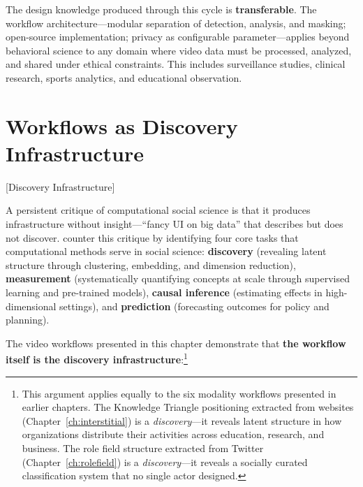 \documentclass[../main.tex]{subfiles}
\begin{document}
The design knowledge produced through this cycle is \textbf{transferable}. The workflow architecture---modular separation of detection, analysis, and masking; open-source implementation; privacy as configurable parameter---applies beyond behavioral science to any domain where video data must be processed, analyzed, and shared under ethical constraints. This includes surveillance studies, clinical research, sports analytics, and educational observation.


\section{Workflows as Discovery Infrastructure}[Discovery Infrastructure]

A persistent critique of computational social science is that it produces infrastructure without insight---``fancy UI on big data'' that describes but does not discover. \textcite{grimmer2021machine} counter this critique by identifying four core tasks that computational methods serve in social science: \textbf{discovery} (revealing latent structure through clustering, embedding, and dimension reduction), \textbf{measurement} (systematically quantifying concepts at scale through supervised learning and pre-trained models), \textbf{causal inference} (estimating effects in high-dimensional settings), and \textbf{prediction} (forecasting outcomes for policy and planning).

The video workflows presented in this chapter demonstrate that \textbf{the workflow itself is the discovery infrastructure}:\footnote{This argument applies equally to the six modality workflows presented in earlier chapters. The Knowledge Triangle positioning extracted from websites (Chapter~\ref{ch:interstitial}) is a \textit{discovery}---it reveals latent structure in how organizations distribute their activities across education, research, and business. The role field structure extracted from Twitter (Chapter~\ref{ch:rolefield}) is a \textit{discovery}---it reveals a socially curated classification system that no single actor designed.}
\end{document}
